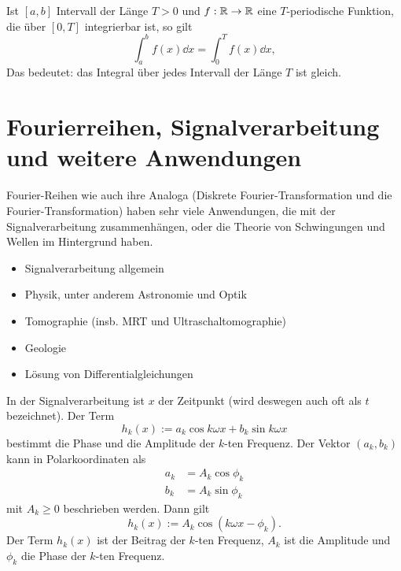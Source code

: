 \begin{bem}
	Ist $[a,b]$ Intervall der Länge $T>0$ und $f : \mathbb{R} \to \mathbb{R}$ eine $T$-periodische Funktion, die über $[0,T]$ integrierbar ist, so gilt 
	\[
		\int_a^b f(x) \dd x = \int_0^T f(x) \dd x,
	\]
	Das bedeutet: das Integral über jedes Intervall der Länge $T$ ist gleich. 
\end{bem} 

\section{Fourierreihen, Signalverarbeitung und weitere Anwendungen} 

\begin{bem}
	Fourier-Reihen wie auch ihre Analoga (Diskrete Fourier-Transformation und die Fourier-Transformation) haben sehr viele Anwendungen, die mit der Signalverarbeitung zusammenhängen, oder die Theorie von Schwingungen und Wellen im Hintergrund haben. 
	\begin{itemize}
			\item Signalverarbeitung allgemein
			\item Physik, unter anderem Astronomie und Optik
			\item Tomographie (insb. MRT und Ultraschaltomographie)
			\item Geologie
			\item Lösung von Differentialgleichungen 
	\end{itemize} 
\end{bem} 

\begin{bem}
	In der Signalverarbeitung ist $x$ der Zeitpunkt (wird deswegen auch oft als $t$ bezeichnet). Der Term	
	\[
	h_k(x):= a_k \cos k \omega x + b_k \sin k \omega x
	\] bestimmt die Phase und die Amplitude der $k$-ten Frequenz. Der Vektor $(a_k,b_k)$ kann in Polarkoordinaten als 
	\begin{align*}
		a_k & = A_k \cos \phi_k
		\\ b_k & = A_k \sin \phi_k
	\end{align*}
	mit $A_k \ge 0$ beschrieben werden. Dann gilt 
	\[
	h_k(x) := A_k \cos( k \omega x  - \phi_k). 
	\]
	Der Term $h_k(x)$ ist der Beitrag der $k$-ten Frequenz, $A_k$ ist die Amplitude und $\phi_k$ die Phase der $k$-ten Frequenz. 
\end{bem} 

